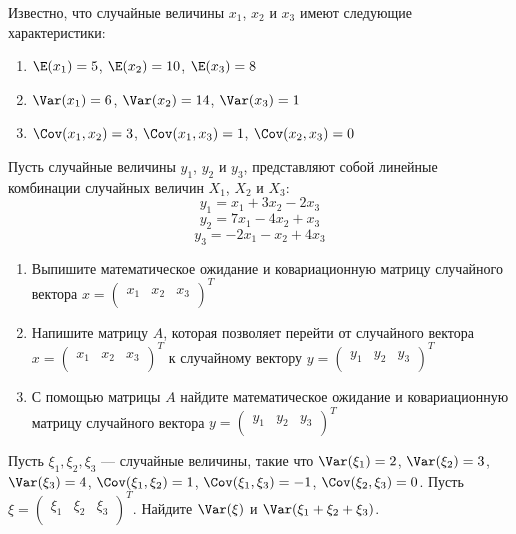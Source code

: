 \documentclass[pdftex,11pt,openany]{book}\usepackage[]{graphicx}\usepackage[]{color}
\begin{document}
\begin{problem}
Известно, что случайные величины $x_1$, $x_2$ и $x_3$ имеют следующие характеристики: 
\begin{enumerate}
\item $\E(x_1) = 5$, $\E(x_2) = 10$, $\E(x_3) = 8$
\item $\Var  (x_1) = 6$, $\Var  (x_2) = 14$, $\Var  (x_3) = 1$
\item $\Cov  (x_1, x_2) = 3$, $\Cov  (x_1, x_3) = 1$, $\Cov  (x_2, x_3) = 0$
\end{enumerate}
Пусть случайные величины $y_1$, $y_2$ и $y_3$, представляют собой линейные комбинации случайных величин $X_1$, $X_2$ и $X_3$:
$$y_1 = x_1 + 3x_2 - 2x_3$$
$$y_2 = 7x_1 - 4x_2 + x_3$$
$$y_3 = -2x_1 - x_2 + 4x_3$$

\begin{enumerate}
\item Выпишите математическое ожидание и ковариационную матрицу случайного вектора $x =  \begin{pmatrix}
x_1 & x_2 & x_3\\
\end{pmatrix} ^T$
\item Напишите матрицу $A$, которая позволяет перейти от случайного вектора $x =  \begin{pmatrix}
x_1 & x_2 & x_3\\
\end{pmatrix} ^T$ к случайному вектору $y =  \begin{pmatrix}
y_1 & y_2 & y_3\\
\end{pmatrix} ^T$
\item С помощью матрицы $A$ найдите математическое ожидание и ковариационную матрицу случайного вектора $y =  \begin{pmatrix}
y_1 & y_2 & y_3\\
\end{pmatrix} ^T$
\end{enumerate}
\end{problem}

\begin{solution}
\end{solution}





\begin{problem}
Пусть $\xi_1, \xi_2, \xi_3$ --- случайные величины, такие что $\Var (\xi_1) = 2$, $\Var (\xi_2) = 3$, $\Var (\xi_3) = 4$, $\Cov (\xi_1, \xi_2) = 1$, $\Cov (\xi_1, \xi_3) = -1$, $\Cov (\xi_2, \xi_3) = 0$. Пусть $\xi =  \begin{pmatrix}
\xi_1 & \xi_2 & \xi_3 \\
\end{pmatrix} ^T$. Найдите $\Var (\xi)$ и $\Var (\xi_1 + \xi_2 + \xi_3)$.
\end{problem}
\end{document}
